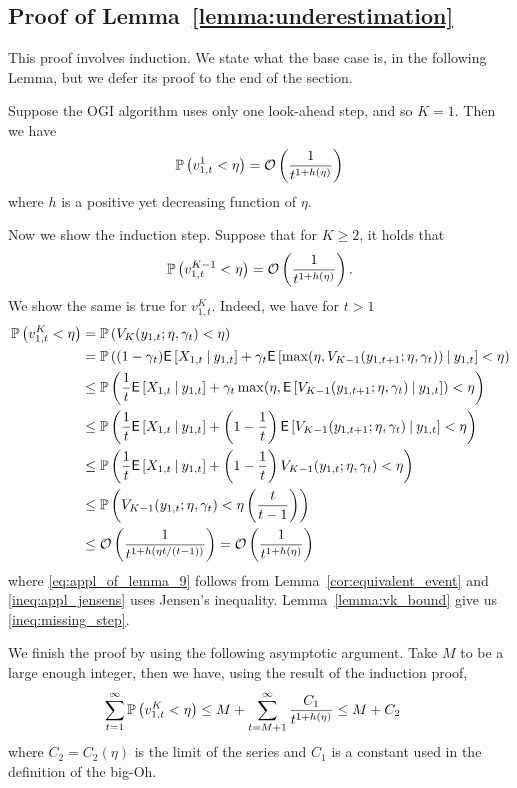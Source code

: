 \subsection{Proof of Lemma~\ref{lemma:underestimation}} \label{proof:underestimation_proof}
\begin{myproof}[Proof.]
	This proof involves induction. We state what the base case is, in the following Lemma, but we defer its proof to the end of the section.
	\begin{lemma} \label{lemma:underestimation_base_case}
		Suppose the OGI algorithm uses only one look-ahead step, and so $K = 1$. Then we have
		\[
		\P{v^1_{1,t} < \eta} = \mathcal{O}\left(\frac{1}{t^{1 + h(\eta)}}\right)
		\]
		where $h$ is a positive yet decreasing function of $\eta$.
	\end{lemma}
	Now we show the induction step. Suppose that for $K \ge 2$, it holds that
	\[
	\P{v^{K-1}_{1,t} < \eta} = \mathcal{O}\left(\frac{1}{t^{1 + h(\eta)}}\right).
	\]
	We show the same is true for $v^{K}_{1,t}$. Indeed, we have for $t > 1$
	\begin{align}
	\P{v^K_{1,t} < \eta} & = \P{V_K(y_{1,t}; \eta, \gamma_t) < \eta} \label{eq:appl_of_lemma_9}\\
	& = \P{(1-\gamma_t)\Ee{X_{1,t} \given y_{1,t}} + \gamma_t \Ee{\max(\eta, V_{K-1}(y_{1,t+1}; \eta, \gamma_{t})) \given y_{1,t}}< \eta} \nonumber \\
	& \le \P{\frac{1}{t}\Ee{X_{1,t} \given y_{1,t}} + \gamma_t \max(\eta, \Ee{V_{K-1}(y_{1,t+1}; \eta, \gamma_{t}) \given y_{1,t}})< \eta} \label{ineq:appl_jensens} \\
	& \le \P{\frac{1}{t}\Ee{X_{1,t} \given y_{1,t}} + \left(1-\frac{1}{t}\right) \Ee{V_{K-1}(y_{1,t+1}; \eta, \gamma_{t}) \given y_{1,t} }< \eta} \nonumber \\
	& \le \P{\frac{1}{t}\Ee{X_{1,t} \given y_{1,t}} + \left(1-\frac{1}{t}\right) V_{K-1}(y_{1,t}; \eta, \gamma_{t})< \eta} \label{ineq:missing_step} \\
	& \le \P{ V_{K-1}(y_{1,t}; \eta, \gamma_{t})< \eta \left(\frac{t}{t-1}\right)} \nonumber \\
	& \le \mathcal{O}\left(\frac{1}{t^{1 + h(\eta t/(t-1))}}\right) =  \mathcal{O}\left(\frac{1}{t^{1 + h(\eta)}}\right) \nonumber
	\end{align}
	where \eqref{eq:appl_of_lemma_9} follows from Lemma~\ref{cor:equivalent_event} and \eqref{ineq:appl_jensens} uses Jensen's inequality. Lemma~\ref{lemma:vk_bound} give us \eqref{ineq:missing_step}.
	
	We finish the proof by using the following asymptotic argument. Take $M$ to be a large enough integer, then we have, using the result of the induction proof,
	\begin{align*}
	\sum_{t=1}^\infty \P{v^K_{1,t} < \eta} & \le M +  \sum_{t=M+1}^\infty \frac{C_1}{t^{1 + h(\eta)}} \le M +  C_2
	\end{align*}
	where $C_2 = C_2(\eta)$ is the limit of the series and $C_1$ is a constant used in the definition of the big-Oh.
\end{myproof}
